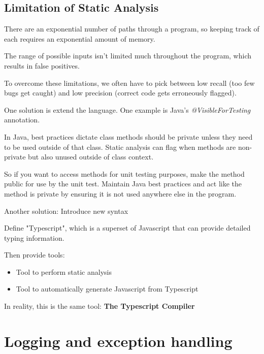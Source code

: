 \documentclass{article}
\begin{document}
\subsection{Limitation of Static Analysis}

There are an exponential number of paths through a program, so keeping track of each requires an exponential amount of memory.

\vspace*{1em}

The range of possible inputs isn't limited much throughout the program, which results in false positives.

\vspace*{1em}

To overcome these limitations, we often have to pick between low recall (too few bugs get caught) and low precision (correct code gets erroneously flagged).

\vspace*{1em}

\hrulefill

One solution is extend the language. One example is Java's \textit{@VisibleForTesting} annotation. 

\vspace*{0.5em}

In Java, best practices dictate class methods should be private unless they need to be used outside of that class. Static analysis can flag when methods are non-private but also unused outside of class context. 

\vspace*{0.5em}

So if you want to access methods for unit testing purposes, make the method public for use by the unit test. Maintain Java best practices and act like the method is private by ensuring it is not used anywhere else in the program.

\hrulefill

Another solution: Introduce new syntax 

\vspace*{.5em}

Define "Typescript", which is a superset of Javascript that can provide detailed typing information.

\vspace*{.5em}

Then provide tools:
\begin{itemize}
    \item Tool to perform static analysis 
    \item Tool to automatically generate Javascript from Typescript 
\end{itemize}

In reality, this is the same tool: \textbf{The Typescript Compiler}

\pagebreak

\section{Logging and exception handling}

\pagebreak
\end{document}

